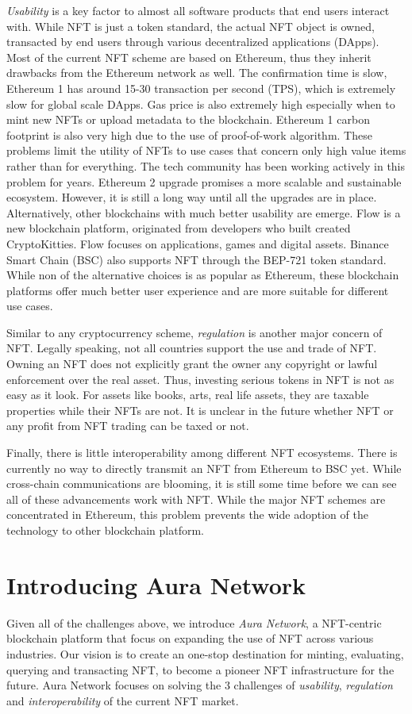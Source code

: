 \documentclass[12pt]{article}
\begin{document}
\emph{Usability} is a key factor to almost all software products that end users interact with. While NFT is just a token standard, the actual NFT object is owned, transacted by end users through various decentralized applications (DApps). Most of the current NFT scheme are based on Ethereum, thus they inherit drawbacks from the Ethereum network as well. The confirmation time is slow, Ethereum 1 has around 15-30 transaction per second (TPS), which is extremely slow for global scale DApps. Gas price is also extremely high especially when to mint new NFTs or upload metadata to the blockchain. Ethereum 1 carbon footprint is also very high due to the use of proof-of-work algorithm. These problems limit the utility of NFTs to use cases that concern only high value items rather than for everything. The tech community has been working actively in this problem for years. Ethereum 2 upgrade promises a more scalable and sustainable ecosystem. However, it is still a long way until all the upgrades are in place. Alternatively, other blockchains with much better usability are emerge. Flow is a new blockchain platform, originated from developers who built created CryptoKitties. Flow focuses on applications, games and digital assets. Binance Smart Chain (BSC) also supports NFT through the BEP-721 token standard. While non of the alternative choices is as popular as Ethereum, these blockchain platforms offer much better user experience and are more suitable for different use cases. 

Similar to any cryptocurrency scheme, \emph{regulation} is another major concern of NFT. Legally speaking, not all countries support the use and trade of NFT. Owning an NFT does not explicitly grant the owner any copyright or lawful enforcement over the real asset. Thus, investing serious tokens in NFT is not as easy as it look. For assets like books, arts, real life assets, they are taxable properties while their NFTs are not. It is unclear in the future whether NFT or any profit from NFT trading can be taxed or not.

Finally, there is little interoperability among different NFT ecosystems. There is currently no way to directly transmit an NFT from Ethereum to BSC yet. While cross-chain communications are blooming, it is still some time before we can see all of these advancements work with NFT. While the major NFT schemes are concentrated in Ethereum, this problem prevents the wide adoption of the technology to other blockchain platform.

\section{Introducing Aura Network}
Given all of the challenges above, we introduce \emph{Aura Network}, a NFT-centric blockchain platform that focus on expanding the use of NFT across various industries. Our vision is to create an one-stop destination for minting, evaluating, querying and transacting NFT, to become a pioneer NFT infrastructure for the future. Aura Network focuses on solving the 3 challenges of \emph{usability}, \emph{regulation} and \emph{interoperability} of the current NFT market.
\end{document}
